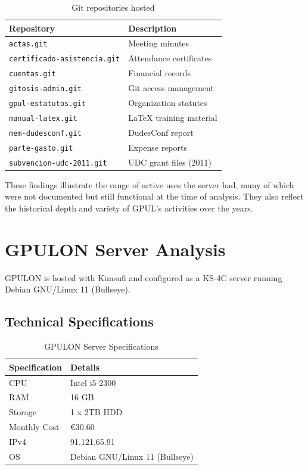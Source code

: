 \begin{table}[H]
  \centering
  \caption{Git repositories hosted}
  \label{tab:gpulino_git_repos}
  \begin{tabular}{ll}
    \rowcolor{udcpink!25}
    \textbf{Repository} & \textbf{Description} \\
    \hline
    \texttt{actas.git} & Meeting minutes \\
    \texttt{certificado-asistencia.git} & Attendance certificates \\
    \texttt{cuentas.git} & Financial records \\
    \texttt{gitosis-admin.git} & Git access management \\
    \texttt{gpul-estatutos.git} & Organization statutes \\
    \texttt{manual-latex.git} & LaTeX training material \\
    \texttt{mem-dudesconf.git} & DudesConf report \\
    \texttt{parte-gasto.git} & Expense reports \\
    \texttt{subvencion-udc-2011.git} & UDC grant files (2011) \\
  \end{tabular}
\end{table}

These findings illustrate the range of active uses the server had, many of which were not documented but still functional at the time of analysis. They also reflect the historical depth and variety of GPUL's activities over the years.

\section{GPULON Server Analysis}

GPULON is hosted with Kimsufi and configured as a KS-4C server running Debian GNU/Linux 11 (Bullseye).

\subsection{Technical Specifications}

\begin{table}[H]
  \centering
  \caption{GPULON Server Specifications}
  \label{tab:gpulon_specs}
  \begin{tabular}{ll}
    \rowcolor{udcpink!25}
    \textbf{Specification} & \textbf{Details} \\
    \hline
    CPU & Intel i5-2300 \\
    RAM & 16 GB \\
    Storage & 1 x 2TB HDD \\
    Monthly Cost & €30.60 \\
    IPv4 & 91.121.65.91 \\
    OS & Debian GNU/Linux 11 (Bullseye) \\
  \end{tabular}
\end{table}

